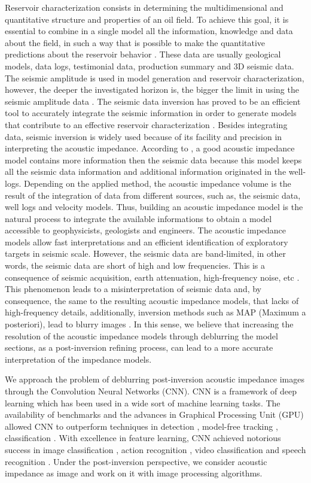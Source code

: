 \documentclass[conference,compsoc]{IEEEtran}
\begin{document}
Reservoir characterization consists in determining the multidimensional
and quantitative structure and properties of an oil field.
To achieve this goal, it is essential to combine in a single model
all the information, knowledge and data about the field, in such a
way that is possible to make the quantitative predictions about the reservoir behavior \cite{buiting}.
These data are usually geological models,
data logs, testimonial data, production summary and 3D seismic data. The seismic
amplitude is used in model generation and  reservoir characterization,
however, the deeper the investigated horizon is, the bigger the limit in using the seismic amplitude data \cite{riel}.
The seismic data inversion has proved to be an efficient tool to accurately integrate the seismic information
in order to generate models that contribute to an effective reservoir characterization \cite{sergio}.
Besides integrating data, seismic inversion is widely used because of its facility and precision
in interpreting the acoustic impedance.
According to \cite{Latimer}, a good acoustic impedance model contains more information
then the seismic data because this model keeps all the seismic data information and additional
information originated in the well-logs.
Depending on the applied method, the acoustic impedance volume is the result of
the integration of data from different sources, such as, the seismic data, well logs and
velocity models. Thus, building an acoustic impedance model is the natural process to 
integrate the available informations to obtain a model accessible to geophysicists, geologists
and engineers. 
The acoustic impedance models allow fast interpretations and an efficient identification of
exploratory targets in seismic scale. However, the seismic data are band-limited, in other words,
the seismic data are short of high and low frequencies. This is a consequence
of seismic acquisition, earth attenuation, high-frequency noise, etc \cite{xiaoiu}. This phenomenon leads
to a misinterpretation of seismic data and, by consequence, the same to the resulting acoustic
impedance models, that lacks of high-frequency details, additionally, inversion methods such as MAP (Maximum a posteriori),
lead to blurry images \cite{Levin}.
In this sense, we believe that increasing the resolution of the acoustic impedance models
through deblurring the model sections, as a post-inversion refining process, can lead to a more accurate
interpretation of the impedance models.

We approach the problem of deblurring post-inversion acoustic impedance images through
the Convolution Neural Networks (CNN). CNN is a framework of deep learning which has been
used in a wide sort of machine learning tasks. The availability of benchmarks
\cite{Russakovsky} and the advances in Graphical Processing Unit (GPU) \cite{Buduma15}
allowed CNN to outperform techniques in detection \cite{Girshick,Bell}, model-free
tracking \cite{Nam}, classification \cite{He}. With excellence in feature learning,
CNN achieved notorious success in image classification \cite{Krizhevsky}, action
recognition \cite{S_Ji}, video classification \cite{AbdelHamid} and speech recognition \cite{Farfade}.
Under the post-inversion perspective, we consider acoustic impedance as image and work on it with
image processing algorithms.
\end{document}
